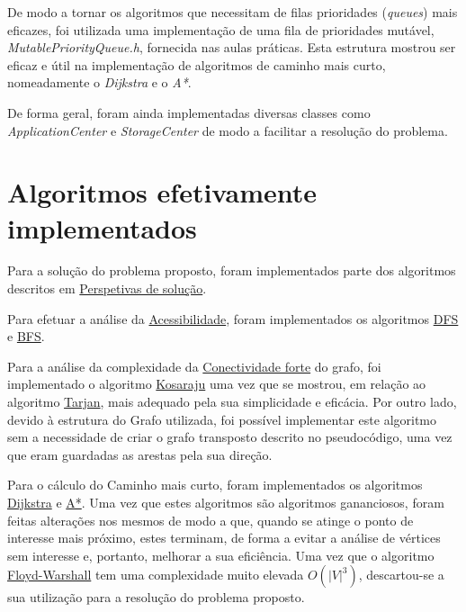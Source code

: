 \documentclass[12pt,a4paper]{report}
\begin{document}
De modo a tornar os algoritmos que necessitam de filas prioridades (\textit{queues}) mais eficazes, foi utilizada uma implementação
de uma fila de prioridades mutável, \textit{MutablePriorityQueue.h}, fornecida nas aulas práticas. Esta estrutura mostrou
ser eficaz e útil na implementação de algoritmos de caminho mais curto, nomeadamente o \textit{Dijkstra} e o \textit{A*}. \par

De forma geral, foram ainda implementadas diversas classes como \textit{ApplicationCenter} e \textit{StorageCenter} de modo a facilitar
a resolução do problema. \par


\chapter{Algoritmos efetivamente implementados}
\label{implementedAlgos}
Para a solução do problema proposto, foram implementados parte dos algoritmos descritos em \hyperref[perspetivas]{Perspetivas de solução}. \par

Para efetuar a análise da \hyperref[perspetivas:acessibilidade]{Acessibilidade}, foram implementados os algoritmos \hyperref[algo:dfs]{DFS} e \hyperref[algo:bfs]{BFS}. \par

Para a análise da complexidade da \hyperref[perspetivas:conectividadeforte]{Conectividade forte} do grafo, foi implementado o algoritmo \hyperref[algo:kosaraju]{Kosaraju} uma vez que 
se mostrou, em relação ao algoritmo \hyperref[algo:tarjan]{Tarjan}, mais adequado pela sua simplicidade e eficácia. Por outro lado, devido à
estrutura do Grafo utilizada, foi possível implementar este algoritmo sem a necessidade de criar o grafo transposto descrito no pseudocódigo,
uma vez que eram guardadas as arestas pela sua direção. \par

Para o cálculo do Caminho mais curto, foram implementados os algoritmos \hyperref[algo:dijkstra]{Dijkstra} e \hyperref[algo:astar]{A*}. 
Uma vez que estes algoritmos são algoritmos gananciosos, foram feitas alterações nos mesmos de modo a que, quando se atinge o ponto de
interesse mais próximo, estes terminam, de forma a evitar a análise de vértices sem interesse e, portanto, melhorar a sua eficiência.
Uma vez que o algoritmo \hyperref[algo:floydwarshall]{Floyd-Warshall} tem uma complexidade muito elevada \( O(|V|^3) \), descartou-se a sua utilização
para a resolução do problema proposto. \par
\end{document}
